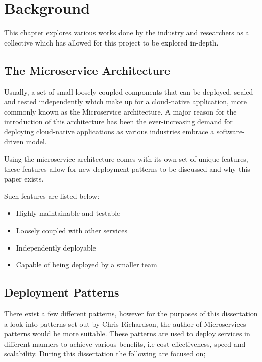 \chapter{Background}
This chapter explores various works done by the industry and researchers as a collective which has allowed for this project to be explored in-depth. 

\section{The Microservice Architecture}
Usually, a set of small loosely coupled components that can be deployed, scaled and tested independently which make up for a cloud-native application, more commonly known as the Microservice architecture. A major reason for the introduction of this architecture has been the ever-increasing demand for deploying cloud-native applications as various industries embrace a software-driven model. 

Using the microservice architecture comes with its own set of unique features, these features allow for new deployment patterns to be discussed and why this paper exists. 

Such features are listed below: 

\begin{itemize}
    \item Highly maintainable and testable 
    \item Loosely coupled with other services 
    \item Independently deployable 
    \item Capable of being deployed by a smaller team
\end{itemize}

\section{Deployment Patterns}
There exist a few different patterns, however for the purposes of this dissertation a look into patterns set out by Chris Richardson, the author of Microservices patterns \cite{Chr19} would be more suitable. These patterns are used to deploy services in different manners to achieve various benefits, i.e cost-effectiveness, speed and scalability. During this dissertation the following are focused on; 

